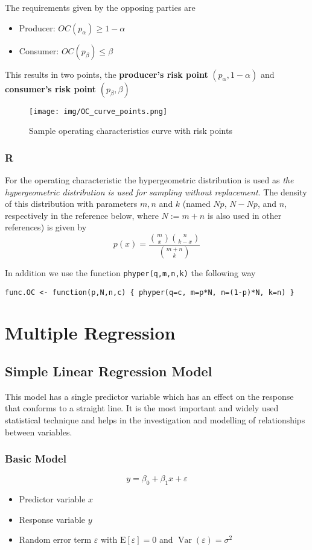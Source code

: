 \documentclass[11pt]{article}
\theoremstyle{definition}
\newcommand*\ev[1]{\mathrel{\text{E}\left[#1\right]}}
\newcommand*\Var[1]{\mathop{\text{Var}}\left(#1\right)}
\begin{document}
The requirements given by the opposing parties are
\begin{itemize}
	\item Producer: $OC(p_\alpha) \geq 1-\alpha$
	\item Consumer: $OC(p_\beta) \leq \beta$
\end{itemize}
This results in two points, the \textbf{producer's risk point} $(p_\alpha, 1-\alpha)$ and \textbf{consumer's risk point} $(p_\beta, \beta)$
\begin{figure}[H]
	\centering
	\texttt{[image: img/OC\_curve\_points.png]}
	\caption{Sample operating characteristics curve with risk points}
\end{figure}

\subsubsection{R}
For the operating characteristic the hypergeometric distribution is used as \textit{the hypergeometric distribution is used for sampling without replacement}. The density of this distribution with parameters $m, n$ and $k$ (named $Np$, $N-Np$, and $n$, respectively in the reference below, where $N := m+n$ is also used in other references) is given by 
\begin{equation*}
	p(x) = \frac{\binom{m}{x}\binom{n}{k-x}}{\binom{m+n}{k}}
\end{equation*}

In addition we use the function \texttt{phyper(q,m,n,k)} the following way
\begin{verbatim}
func.OC <- function(p,N,n,c) { phyper(q=c, m=p*N, n=(1-p)*N, k=n) }
\end{verbatim}

\section{Multiple Regression}

\subsection{Simple Linear Regression Model}
This model has a single predictor variable which has an effect on the response that conforms to a straight line. It is the most important and widely used statistical technique and helps in the investigation and modelling of relationships between variables.

\subsubsection{Basic Model}
\begin{equation*}
	y = \beta_0 + \beta_1 x + \varepsilon
\end{equation*}
\begin{itemize}
	\item Predictor variable $x$
	\item Response variable $y$
	\item Random error term $\varepsilon$ with $\ev{\varepsilon} = 0$ and $\Var{\varepsilon} = \sigma^2$
\end{itemize}
\end{document}

